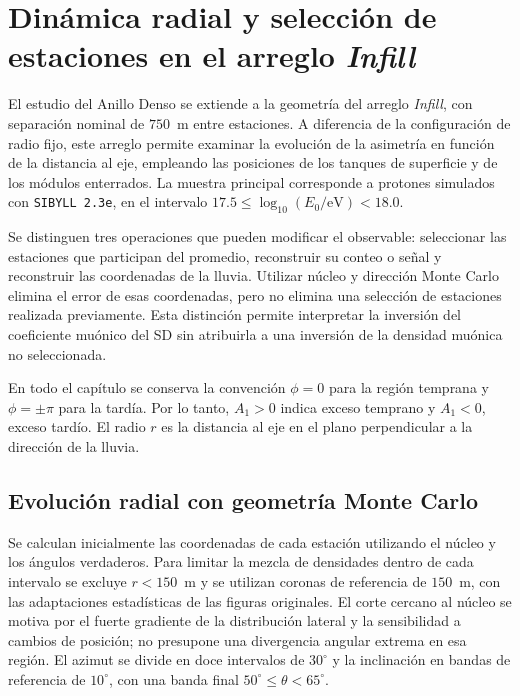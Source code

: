 
\section{Dinámica radial y selección de estaciones en el arreglo \textit{Infill}}
\label{cap:infill}

El estudio del Anillo Denso se extiende a la geometría del arreglo \textit{Infill}, con separación nominal de $750$~m entre estaciones. A diferencia de la configuración de radio fijo, este arreglo permite examinar la evolución de la asimetría en función de la distancia al eje, empleando las posiciones de los tanques de superficie y de los módulos enterrados. La muestra principal corresponde a protones simulados con \texttt{SIBYLL 2.3e}, en el intervalo $17.5\leq\log_{10}(E_0/\mathrm{eV})<18.0$.

Se distinguen tres operaciones que pueden modificar el observable: seleccionar las estaciones que participan del promedio, reconstruir su conteo o señal y reconstruir las coordenadas de la lluvia. Utilizar núcleo y dirección Monte Carlo elimina el error de esas coordenadas, pero no elimina una selección de estaciones realizada previamente. Esta distinción permite interpretar la inversión del coeficiente muónico del SD sin atribuirla a una inversión de la densidad muónica no seleccionada.

En todo el capítulo se conserva la convención $\phi=0$ para la región temprana y $\phi=\pm\pi$ para la tardía. Por lo tanto, $A_1>0$ indica exceso temprano y $A_1<0$, exceso tardío. El radio $r$ es la distancia al eje en el plano perpendicular a la dirección de la lluvia.

\subsection{Evolución radial con geometría Monte Carlo}
\label{subsec:infill_mc}

Se calculan inicialmente las coordenadas de cada estación utilizando el núcleo y los ángulos verdaderos. Para limitar la mezcla de densidades dentro de cada intervalo se excluye $r<150$~m y se utilizan coronas de referencia de $150$~m, con las adaptaciones estadísticas de las figuras originales. El corte cercano al núcleo se motiva por el fuerte gradiente de la distribución lateral y la sensibilidad a cambios de posición; no presupone una divergencia angular extrema en esa región. El azimut se divide en doce intervalos de $30^\circ$ y la inclinación en bandas de referencia de $10^\circ$, con una banda final $50^\circ\leq\theta<65^\circ$.

